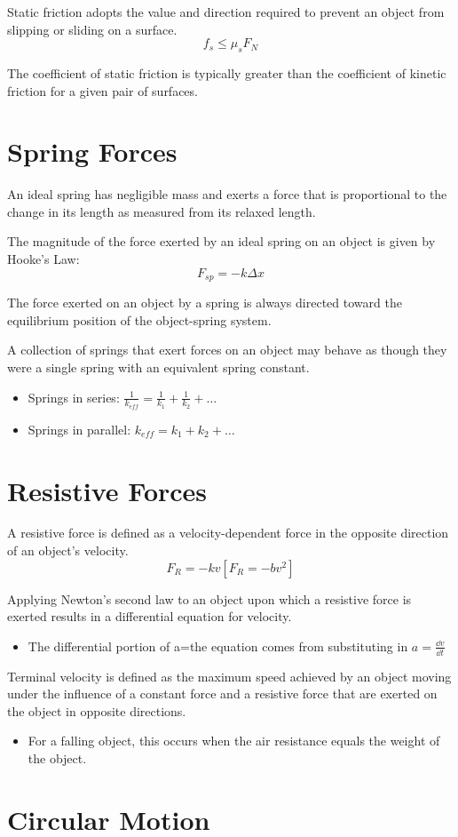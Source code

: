 \documentclass[../mech.tex]{subfiles}
\begin{document}
Static friction adopts the value and direction required to prevent an object from slipping or sliding on a surface.
\[ f_s \leq \mu_s F_N \]

The coefficient of static friction is typically greater than the coefficient of kinetic friction for a given pair of surfaces.
\section{Spring Forces}
An ideal spring has negligible mass and exerts a force that is proportional to the change in its length as measured from its relaxed length.

The magnitude of the force exerted by an ideal spring on an object is given by Hooke's Law:
\[ F_{sp}=-k\Delta x \] 

The force exerted on an object by a spring is always directed toward the equilibrium position of the object-spring system.

A collection of springs that exert forces on an object may behave as though they were a single spring with an equivalent spring constant.
\begin{itemize}
    \item Springs in series: $\frac{1}{k_{eff}}=\frac{1}{k_1}+\frac{1}{k_2}+\dots$
    \item Springs in parallel: $k_{eff}=k_1+k_2+\dots$
\end{itemize}
\section{Resistive Forces}
A resistive force is defined as a velocity-dependent force in the opposite direction of an object's velocity.
\[ F_R=-kv [F_R=-bv^2] \]

Applying Newton's second law to an object upon which a resistive force is exerted results in a differential equation for velocity.
\begin{itemize}
    \item The differential portion of a=the equation comes from substituting in $a=\frac{\dd v}{\dd t}$
\end{itemize}

Terminal velocity is defined as the maximum speed achieved by an object moving under the influence of a constant force and a resistive force that are exerted on the object in opposite directions.
\begin{itemize}
    \item For a falling object, this occurs when the air resistance equals the weight of the object.
\end{itemize}

\section{Circular Motion}
\end{document}
